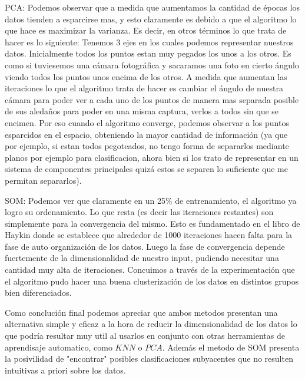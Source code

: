 PCA: Podemos observar que a medida que aumentamos la cantidad de épocas los datos tienden a esparcirse mas, y esto claramente es debido a que el algoritmo lo que hace es maximizar la varianza. Es decir, en otros términos lo que trata de hacer es lo siguiente:
Tenemos 3 ejes en los cuales podemos representar nuestros datos. Inicialmente todos los puntos estan muy pegados los unos a los otros. Es como si tuviesemos una cámara fotográfica y sacaramos una foto en cierto ángulo viendo todos los puntos unos encima de los otros. A medida que aumentan las iteraciones lo que el algoritmo trata de hacer es cambiar el ángulo de nuestra cámara para poder ver a cada uno de los puntos de manera mas separada posible de sus aledaños para poder en una misma captura, verlos a todos sin que se encimen. Por eso cuando el algoritmo converge, podemos observar a los puntos esparcidos en el espacio, obteniendo la mayor cantidad de información (ya que por ejemplo, si estan todos pegoteados, no tengo forma de separarlos mediante planos por ejemplo para clasificacion, ahora bien si los trato de representar en un sistema de componentes principales quizá estos se separen lo suficiente que me permitan separarlos).

SOM: Podemos ver que claramente en un 25\% de entrenamiento, el algoritmo ya logro su ordenamiento. Lo que resta (es decir las iteraciones restantes) son simplemente para la convergencia del mismo. Esto es fundamentado en el libro de Haykin donde se establece que alrededor de 1000 iteraciones hacen falta para la fase de auto organización de los datos. Luego la fase de convergencia depende fuertemente de la dimensionalidad de nuestro input, pudiendo necesitar una cantidad muy alta de iteraciones. Concuimos a través de la experimentación que el algoritmo pudo hacer una buena clusterización de los datos en distintos grupos bien diferenciados.

Como conclución final podemos apreciar que ambos metodos presentan una alternativa simple y eficaz a la hora de reducir la dimensionalidad de los datos lo que podría resultar muy util al usarlos en conjunto con otras herramientas de aprendisaje automatico, como $KNN$ o $PCA$. Además el metodo de SOM presenta la posivilidad de "encontrar" posibles clasificaciones subyacentes que no resulten intuitivas a priori sobre los datos.